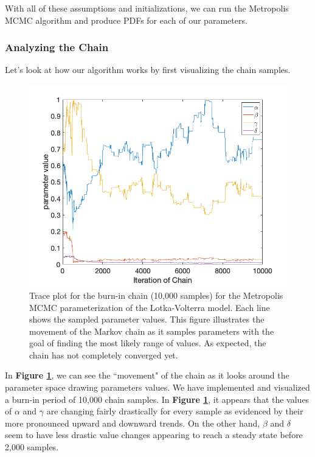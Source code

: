 \documentclass{article}
\begin{document}
With all of these assumptions and initializations, we can run the Metropolis MCMC algorithm and produce PDFs for each of our parameters. 
\subsubsection{Analyzing the Chain} \label{Analyzing_the_chain_Met}
Let's look at how our algorithm works by first visualizing the chain samples.
\begin{figure}[H]
    \centering
    \includegraphics[width=15cm]{MCMC_figs/met_lv_final/final_mh_burninchain.png}
    \caption{Trace plot for the burn-in chain (10,000 samples) for the Metropolis MCMC parameterization of the Lotka-Volterra model. Each line shows the sampled parameter values. This figure illustrates the movement of the Markov chain as it samples parameters with the goal of finding the most likely range of values. As expected, the chain has not completely converged yet.}
    \label{fig:1mcmc}
\end{figure}
In \textbf{Figure \ref{fig:1mcmc}}, we can see the ``movement" of the chain as it looks around the parameter space drawing parameters values. We have implemented and visualized a burn-in period of 10,000 chain samples. In \textbf{Figure \ref{fig:1mcmc}}, it appears that the values of $\alpha$ and $\gamma$ are changing fairly drastically for every sample as evidenced by their more pronounced upward and downward trends. On the other hand, $\beta$ and $\delta$ seem to have less drastic value changes appearing to reach a steady state before 2,000 samples.
\end{document}
